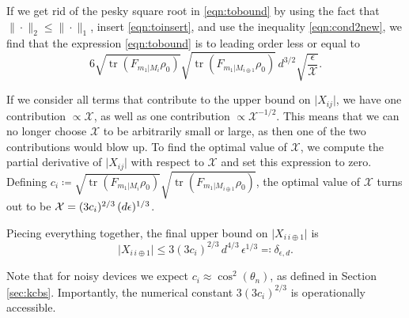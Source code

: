 If we get rid of the pesky square root in \ref{eqn:tobound} by using the fact that $\|\cdot\|_2\leq \|\cdot\|_1$, insert \ref{eqn:toinsert}, and use the inequality \ref{eqn:cond2new}, we find that the expression \ref{eqn:tobound} is to leading order less or equal to
\begin{equation}
6\sqrt{\operatorname{tr}(F_{m_1\vert M_i}\rho_0)}\sqrt{\operatorname{tr}(F_{m_1\vert M_{i\oplus 1}}\rho_0)}\,d^{3/2}\sqrt{\frac{\epsilon}{\mathcal{X}}}.
\end{equation}

If we consider all terms that contribute to the upper bound on $\vert X_{ij} \vert$, we have one contribution $\propto \mathcal{X}$, as well as one contribution $\propto \mathcal{X}^{-1/2}$. This means that we can no longer choose $\mathcal{X}$ to be arbitrarily small or large, as then one of the two contributions would blow up. To find the optimal value of $\mathcal{X}$, we compute the partial derivative of $\vert X_{ij}\vert$ with respect to $\mathcal{X}$ and set this expression to zero. Defining $ c_i \coloneqq \sqrt{\operatorname{tr}(F_{m_1\vert M_i}\rho_0)}\sqrt{\operatorname{tr}(F_{m_1\vert M_{i\oplus 1}}\rho_0)}$, the optimal value of $\mathcal{X}$ turns out to be $\mathcal{X}=(3 c_i)^{2/3}\thinspace(d \epsilon)^{1/3}$.

Piecing everything together, the final upper bound on $\vert X_{i\,i\oplus 1} \vert$ is
\begin{equation}
\vert X_{i\,i\oplus 1} \vert \leq 3(3c_i)^{2/3}\,d^{4/3}\,\epsilon^{1/3}\eqqcolon \delta_{\epsilon,d}.
\end{equation}

Note that for noisy devices we expect $c_i\approx \cos^2(\theta_n)$, as defined in Section \ref{sec:kcbs}. Importantly, the numerical constant $3(3c_i)^{2/3}$ is operationally accessible.

 
